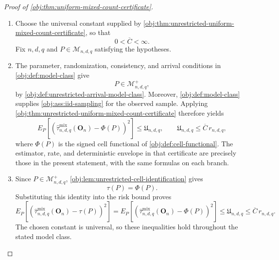 \begin{proof}[Proof of \cref{obj:thm:uniform-mixed-count-certificate}]
\begin{enumerate}
\item Choose the universal constant supplied by
\cref{obj:thm:unrestricted-uniform-mixed-count-certificate}, so that
\[
0<\overline C<\infty.
\]
Fix \(n,d,q\) and \(P\in\mathcal M_{n,d,q}\) satisfying the hypotheses.

\item The parameter, randomization, consistency, and arrival conditions in
\cref{obj:def:model-class} give
\[
P\in\mathcal M^{+}_{n,d,q},
\]
by \cref{obj:def:unrestricted-arrival-model-class}. Moreover,
\cref{obj:def:model-class} supplies
\cref{obj:ass:iid-sampling} for the observed sample. Applying
\cref{obj:thm:unrestricted-uniform-mixed-count-certificate} therefore yields
\[
E_P\!\left[
\left(\widehat\tau^{\mathrm{mix}}_{n,d,q}(\mathbf O_n)-\Phi(P)\right)^2
\right]
\le \mathfrak U_{n,d,q},
\qquad
\mathfrak U_{n,d,q}\le \overline C\,r_{n,d,q},
\]
where \(\Phi(P)\) is the signed cell functional of
\cref{obj:def:cell-functional}. The estimator, rate, and deterministic
envelope in that certificate are precisely those in the present statement,
with the same formulas on each branch.

\item Since \(P\in\mathcal M^{+}_{n,d,q}\),
\cref{obj:lem:unrestricted-cell-identification} gives
\[
\tau(P)=\Phi(P).
\]
Substituting this identity into the risk bound proves
\[
E_P\!\left[
\left(\widehat\tau^{\mathrm{mix}}_{n,d,q}(\mathbf O_n)-\tau(P)\right)^2
\right]
=
E_P\!\left[
\left(\widehat\tau^{\mathrm{mix}}_{n,d,q}(\mathbf O_n)-\Phi(P)\right)^2
\right]
\le \mathfrak U_{n,d,q}
\le \overline C\,r_{n,d,q}.
\]
The chosen constant is universal, so these inequalities hold throughout
the stated model class.
\end{enumerate}
\end{proof}

